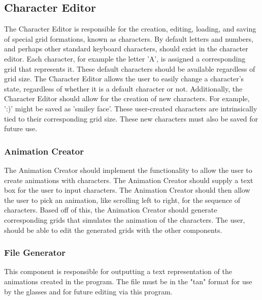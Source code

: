 \documentclass[12pt]{article}
\begin{document}
	\subsection { Character Editor}
  	The Character Editor is responsible for the creation, editing, loading, and saving of special grid formations, known as characters. By default letters and numbers, and perhaps other standard keyboard characters, should exist in the character editor. Each character, for example the letter 'A', is assigned a corresponding grid that represents it.	
  	These default characters should be available regardless of grid size. The Character Editor allows the user to easily change a character's state, regardless of whether it is a default character or not.	
  	Additionally, the Character Editor should allow for the creation of new characters. For example, ':)' might be saved as 'smiley face'. These user-created characters are intrinsically tied to their corresponding grid size. These new characters must also be saved for future use.
	
	\subsubsection{Animation Creator}
  	The Animation Creator should implement the functionality to allow the user to create animations with characters. The Animation Creator should supply a text box for the user to input characters. The Animation Creator should then allow the user to pick an animation, like scrolling left to right, for the sequence of characters.	
  	Based off of this, the Animation Creator should generate corresponding grids that simulates the animation of the characters. The user, should be able to edit the generated grids with the other components. 
	
	\subsubsection{File Generator}
  	This component is responsible for outputting a text representation of the animations created in the program. The file must be in the "tan" format for use by the glasses and for future editing via this program.
	
\end{document}
